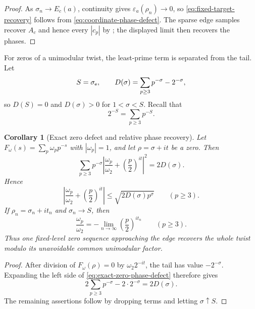\documentclass[11pt]{article}
\newtheorem{corollary}[theorem]{Corollary}
\theoremstyle{definition}
\theoremstyle{remark}
\newcommand{\eps}{\varepsilon}
\begin{document}
\begin{proof}
As $\sigma_n\to E_c(a)$, continuity gives
$\eps_a(\rho_n)\to0$, so \eqref{eq:fixed-target-recovery} follows from
\eqref{eq:coordinate-phase-defect}.  The sparse edge samples recover
$A_c$ and hence every $|c_p|$ by
; the displayed limit then recovers the phases.
\end{proof}

For zeros of a unimodular twist, the least-prime term is separated from
the tail.  Let
\begin{equation}
 S=\sigma_{\rm e},
 \qquad
 D(\sigma)=\sum_{p\ge3}p^{-\sigma}-2^{-\sigma},
 \label{eq:zero-defect}
\end{equation}
so $D(S)=0$ and $D(\sigma)>0$ for $1<\sigma<S$.  Recall that
\[
 2^{-S}=\sum_{p\ge3}p^{-S}.
\]

\begin{corollary}[Exact zero defect and relative phase recovery]
\label{cor:zero-phase-defect}
Let $F_\omega(s)=\sum_p\omega_pp^{-s}$ with $|\omega_p|=1$, and let
$\rho=\sigma+it$ be a zero.  Then
\begin{equation}
 \boxed{
 \sum_{p\ge3}p^{-\sigma}
 \left|\frac{\omega_p}{\omega_2}
       +\left(\frac p2\right)^{it}\right|^2
 =2D(\sigma).}
 \label{eq:exact-zero-phase-defect}
\end{equation}
Hence
\begin{equation}
 \left|\frac{\omega_p}{\omega_2}
       +\left(\frac p2\right)^{it}\right|
 \le \sqrt{2D(\sigma)p^\sigma}
 \qquad(p\ge3).
 \label{eq:zero-coordinate-bound}
\end{equation}
If $\rho_n=\sigma_n+it_n$ and $\sigma_n\to S$, then
\begin{equation}
 \boxed{
 \frac{\omega_p}{\omega_2}
 =-\lim_{n\to\infty}\left(\frac p2\right)^{it_n}}
 \qquad(p\ge3).
 \label{eq:zero-relative-recovery}
\end{equation}
Thus one fixed-level zero sequence approaching the edge recovers the
whole twist modulo its unavoidable common unimodular factor.
\end{corollary}

\begin{proof}
After division of $F_\omega(\rho)=0$ by
$\omega_2 2^{-it}$, the tail has value $-2^{-\sigma}$.  Expanding the
left side of \eqref{eq:exact-zero-phase-defect} therefore gives
\[
 2\sum_{p\ge3}p^{-\sigma}-2\cdot2^{-\sigma}=2D(\sigma).
\]
The remaining assertions follow by dropping terms and letting
$\sigma\uparrow S$.
\end{proof}
\end{document}
